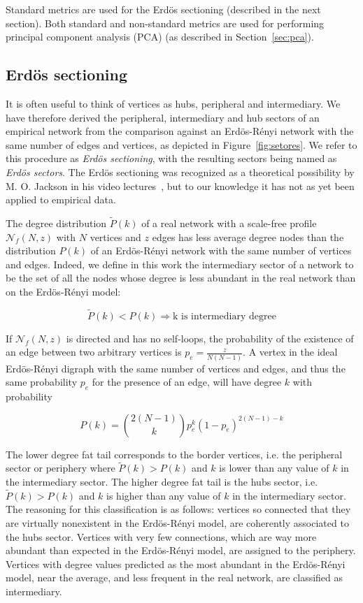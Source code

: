 Standard metrics are used for the Erd\"os sectioning (described in the next section).
Both standard and non-standard metrics are used
for performing principal component analysis (PCA) (as described in Section~\ref{sec:pca}).


\subsection{Erd\"os sectioning}\label{sectioning}
It is often useful to think of vertices as hubs, peripheral and intermediary. We have therefore derived the peripheral, intermediary and hub sectors of an empirical network from the comparison against an Erd\"os-R\'enyi network with the same number of edges and vertices,
as depicted in Figure~\ref{fig:setores}. We refer to this procedure as \emph{Erd\"os sectioning}, with the resulting sectors being named as \emph{Erd\"os sectors}. The Erd\"os sectioning was recognized as a theoretical possibility by M. O. Jackson in his video lectures~\cite{3setores}, but to our knowledge it has not as yet been applied to empirical data.

The degree distribution $\widetilde{P}(k)$ of a real network with a scale-free profile $\mathcal{N}_f(N,z)$ with $N$ vertices and $z$ edges has less
average degree nodes than the distribution $P(k)$ of an Erd\"os-R\'enyi
network with the same number of vertices and edges. Indeed, we define in this work the intermediary sector of a network to be the set of all the nodes whose degree is less abundant in the real network than on the Erd\"os-R\'enyi model:

\begin{equation}\label{criterio}
\widetilde{P}(k)<P(k) \Rightarrow \text{k is intermediary degree}
\end{equation}

If $\mathcal{N}_f(N,z)$ is directed and has no self-loops, the probability of the existence
of an edge between two arbitrary vertices is $p_e=\frac{z}{N(N-1)}$.
A vertex in the ideal Erd\"os-R\'enyi digraph with the same number of vertices and edges, and thus the same probability $p_e$ for the presence of an edge, will have degree $k$ with probability

\begin{equation}
P(k)=\binom{2(N-1)}{k}p_e^k(1-p_e)^{2(N-1)-k}
\end{equation}

The lower degree fat tail corresponds to the border vertices, i.e. the peripheral sector or periphery where $\widetilde{P}(k)>P(k)$ and $k$ is lower than any value of $k$ in the intermediary sector.
The higher degree fat tail is the hubs sector, i.e. $\widetilde{P}(k)>P(k)$ and $k$ is higher than any value of $k$ in the intermediary sector. The reasoning for this classification is as follows: vertices so connected that they are virtually nonexistent in the Erd\"os-R\'enyi model, are coherently associated to the hubs sector.
Vertices with very few connections, which are way more abundant than expected in the Erd\"os-R\'enyi model,
are assigned to the periphery.
Vertices with degree values predicted as the most abundant in the Erd\"os-R\'enyi model,
near the average, and less frequent in the real network, are classified as intermediary.

